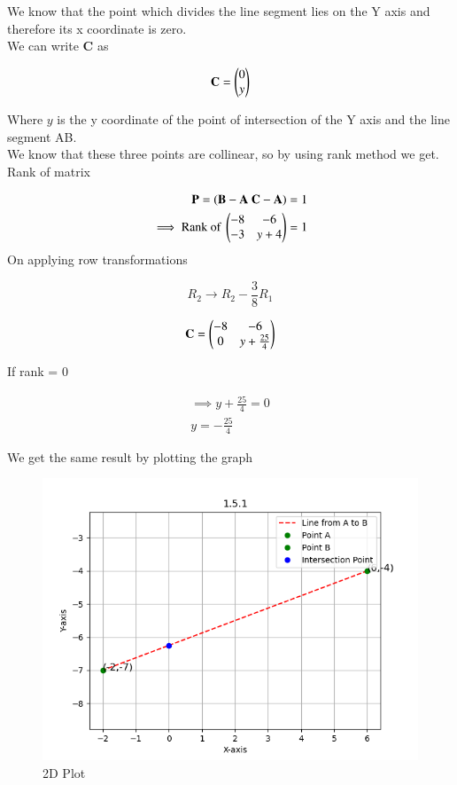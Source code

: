 \documentclass[journal]{IEEEtran}
\begin{document}
We know that the point which divides the line segment lies on the Y axis and therefore its x coordinate is zero.\\

We can write \textbf{C} as 

\begin{align}
    \mathbf{C} = \myvec{0 \\ y}
    \label{0.3}
\end{align}

Where $y$ is the y coordinate of the point of intersection of the Y axis and the line segment AB.\\
We know that these three points are collinear, so by using rank method we get. Rank of matrix 

\begin{align}
    \textbf{P} = (\textbf{B}-\textbf{A} \text{ } \textbf{C}-\textbf{A}) = 1 \\
    \implies \text{Rank of } \myvec{-8 & -6 \\ -3 & y+4} = 1
    \label{0.4}
\end{align}
On applying row transformations

$$ R_2 \rightarrow R_2 - \frac{3}{8}R_1$$

\begin{align}
    \textbf{C} = \myvec{-8 & -6 \\ 0 & y+\frac{25}{4}}\\
\end{align}

If rank = 0

\begin{align}
    \implies y+\frac{25}{4} = 0\\
    y = -\frac{25}{4}
\end{align}



We get the same result by plotting the graph

\begin{figure}[H]
    \centering
    \includegraphics[width=1.1\columnwidth]{figs/fig1.png}
    \caption{2D Plot}
    \label{fig:placeholder}
\end{figure}
\end{document}
